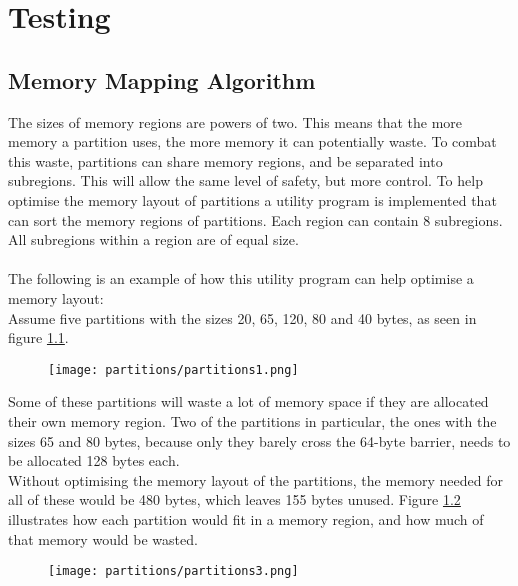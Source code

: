 \chapter{Testing}

\section{Memory Mapping Algorithm}
The sizes of memory regions are powers of two. This means that the more
memory a partition uses, the more memory it can potentially waste. To combat
this waste, partitions can share memory regions, and be separated
into subregions. This will allow the same level of safety, but more control.
To help optimise the memory layout of partitions a utility program is implemented
that can sort the memory regions of partitions. Each region can contain 8
subregions. All subregions within a region are of equal size.
\\\\
The following is an example of how this utility program can help optimise a
memory layout:
\\


Assume five partitions with the sizes 20, 65, 120, 80 and 40 bytes, as seen in figure \ref{fig:ce2}.\\

\begin{figure}[H]
\centering
\texttt{[image: partitions/partitions1.png]}
\label{fig:ce2}
\end{figure}

Some of these partitions will waste a lot of memory space if they are allocated their
own memory region. Two of the partitions in particular, the ones with the sizes
65 and 80 bytes, because only they barely cross the 64-byte barrier, needs to be
allocated 128 bytes each.\\
Without optimising the memory layout of the partitions, the memory needed for
all of these would be 480 bytes, which leaves 155 bytes unused. Figure
\ref{fig:ce3} illustrates how each partition would fit in a memory region, and how
much of that memory would be wasted.

\begin{figure}[H]
\centering
\texttt{[image: partitions/partitions3.png]}
\label{fig:ce3}
\end{figure}

